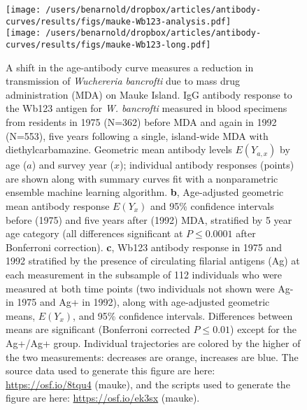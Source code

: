 \documentclass[11pt]{article}
\begin{document}
\begin{figure}[htbp]
\begin{center}
\texttt{[image: /users/benarnold/dropbox/articles/antibody-curves/results/figs/mauke-Wb123-analysis.pdf]} \\
\texttt{[image: /users/benarnold/dropbox/articles/antibody-curves/results/figs/mauke-Wb123-long.pdf]}
\begin{minipage}{\textwidth}
\caption{A shift in the age-antibody curve measures a reduction in transmission of \textit{Wuchereria bancrofti} due to mass drug administration (MDA) on Mauke Island.  IgG antibody response to the Wb123 antigen for \textit{W. bancrofti} measured in blood specimens from residents in 1975 (N=362) before MDA and again in 1992 (N=553), five years following a single, island-wide MDA with diethylcarbamazine. Geometric mean antibody levels $E(Y_{a,x})$ by age ($a$) and survey year ($x$); individual antibody responses (points) are shown along with summary curves fit with a nonparametric ensemble machine learning algorithm. \textbf{b}, Age-adjusted geometric mean antibody response $E(Y_{x})$ and 95\% confidence intervals before (1975) and five years after (1992) MDA, stratified by 5 year age category (all differences significant at $P\leq0.0001$ after Bonferroni correction). \textbf{c}, Wb123 antibody response in 1975 and 1992 stratified by the presence of circulating filarial antigens (Ag) at each measurement in the subsample of 112 individuals who were measured at both time points (two individuals not shown were Ag- in 1975 and Ag+ in 1992), along with age-adjusted geometric means, $E(Y_{x})$, and 95\% confidence intervals. Differences between means are significant (Bonferroni corrected $P\leq0.01$) except for the Ag+/Ag+ group. Individual trajectories are colored by the higher of the two measurements: decreases are orange, increases are blue. The source data used to generate this figure are here: \url{https://osf.io/8tqu4} (mauke), and the scripts used to generate the figure are here: \url{https://osf.io/ek3sx} (mauke). }
\label{fig:mauke}
\end{minipage}
\end{center}
\end{figure}
\end{document}
